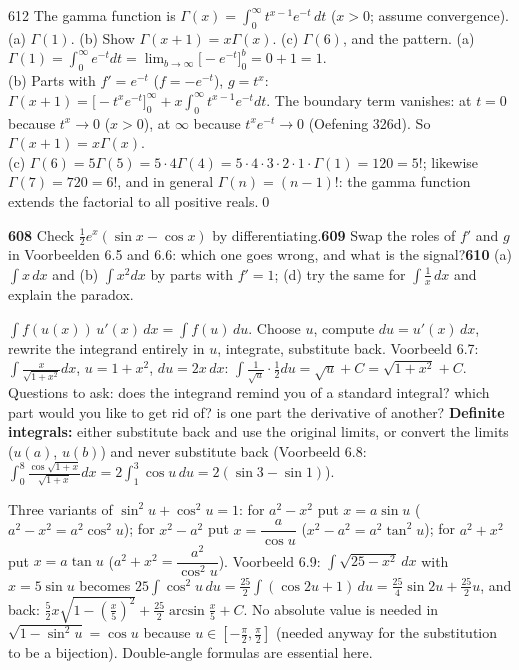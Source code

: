 \begin{bookex}{612}
The gamma function is $\Gamma(x)=\int_0^\infty t^{x-1}e^{-t}\,dt$ ($x>0$; assume convergence). (a) $\Gamma(1)$. (b) Show $\Gamma(x+1)=x\Gamma(x)$. (c) $\Gamma(6)$, and the pattern.
\solution
(a) $\Gamma(1)=\int_0^\infty e^{-t}dt=\lim_{b\to\infty}\big[-e^{-t}\big]_0^b=0+1=1$.\\
(b) Parts with $f'=e^{-t}$ ($f=-e^{-t}$), $g=t^x$: $\Gamma(x+1)=\big[-t^xe^{-t}\big]_0^\infty+x\int_0^\infty t^{x-1}e^{-t}dt$. The boundary term vanishes: at $t=0$ because $t^x\to0$ ($x>0$), at $\infty$ because $t^xe^{-t}\to0$ (Oefening 326d). So $\Gamma(x+1)=x\Gamma(x)$.\\
(c) $\Gamma(6)=5\Gamma(5)=5\cdot4\Gamma(4)=5\cdot4\cdot3\cdot2\cdot1\cdot\Gamma(1)=120=5!$; likewise $\Gamma(7)=720=6!$, and in general $\Gamma(n)=(n-1)!$: the gamma function extends the factorial to all positive reals.\qed
\end{bookex}

\begin{trybox}[{608, 609, 610(a),(b),(d)}]
\textbf{608} Check $\frac12e^x(\sin x-\cos x)$ by differentiating.\quad \textbf{609} Swap the roles of $f'$ and $g$ in Voorbeelden 6.5 and 6.6: which one goes wrong, and what is the signal?\quad \textbf{610} (a) $\int x\,dx$ and (b) $\int x^2dx$ by parts with $f'=1$; (d) try the same for $\int\frac1x\,dx$ and explain the paradox.
\end{trybox}

\begin{key}
$\displaystyle\int f(u(x))\,u'(x)\,dx=\int f(u)\,du$. Choose $u$, compute $du=u'(x)\,dx$, rewrite the integrand entirely in $u$, integrate, substitute back. Voorbeeld 6.7: $\int\frac{x}{\sqrt{1+x^2}}dx$, $u=1+x^2$, $du=2x\,dx$: $\int\frac1{\sqrt u}\cdot\frac12du=\sqrt u+C=\sqrt{1+x^2}+C$. Questions to ask: does the integrand remind you of a standard integral? which part would you like to get rid of? is one part the derivative of another? \textbf{Definite integrals:} either substitute back and use the original limits, or convert the limits ($u(a)$, $u(b)$) and never substitute back (Voorbeeld 6.8: $\int_0^8\frac{\cos\sqrt{1+x}}{\sqrt{1+x}}dx=2\int_1^3\cos u\,du=2(\sin3-\sin1)$).
\end{key}
\begin{strategy}
Three variants of $\sin^2u+\cos^2u=1$: for $a^2-x^2$ put $x=a\sin u$ ($a^2-x^2=a^2\cos^2u$); for $x^2-a^2$ put $x=\dfrac a{\cos u}$ ($x^2-a^2=a^2\tan^2u$); for $a^2+x^2$ put $x=a\tan u$ ($a^2+x^2=\dfrac{a^2}{\cos^2u}$). Voorbeeld 6.9: $\int\sqrt{25-x^2}\,dx$ with $x=5\sin u$ becomes $25\int\cos^2u\,du=\frac{25}2\int(\cos2u+1)\,du=\frac{25}4\sin2u+\frac{25}2u$, and back: $\frac52x\sqrt{1-(\frac x5)^2}+\frac{25}2\arcsin\frac x5+C$. No absolute value is needed in $\sqrt{1-\sin^2u}=\cos u$ because $u\in[-\frac\pi2,\frac\pi2]$ (needed anyway for the substitution to be a bijection). Double-angle formulas are essential here.
\end{strategy}

